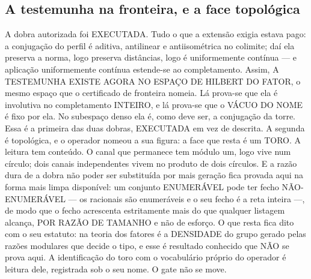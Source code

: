\documentclass[11pt]{article}
\theoremstyle{definition}\newtheorem{deriv}{Derivação}
\begin{document}
\subsection*{A testemunha na fronteira, e a face topol\'ogica}A dobra autorizada foi EXECUTADA. Tudo o que a extens\~ao exigia estava pago: a conjuga\c{c}\~ao do perfil \'e aditiva, antilinear e antiisom\'etrica no colimite; da\'i ela preserva a norma, logo preserva dist\^ancias, logo \'e uniformemente cont\'inua --- e aplica\c{c}\~ao uniformemente cont\'inua estende-se ao completamento. Assim, A TESTEMUNHA EXISTE AGORA NO ESPA\c{C}O DE HILBERT DO FATOR, o mesmo espa\c{c}o que o certificado de fronteira nomeia. L\'a prova-se que ela \'e involutiva no completamento INTEIRO, e l\'a prova-se que o V\'ACUO DO NOME \'e fixo por ela. No subespa\c{c}o denso ela \'e, como deve ser, a conjuga\c{c}\~ao da torre. Essa \'e a primeira das duas dobras, EXECUTADA em vez de descrita. A segunda \'e topol\'ogica, e o operador nomeou a sua figura: a face que resta \'e um TORO. A leitura tem conte\'udo. O canal que permanece tem m\'odulo um, logo vive num c\'irculo; dois canais independentes vivem no produto de dois c\'irculos. E a raz\~ao dura de a dobra n\~ao poder ser substitu\'ida por mais gera\c{c}\~ao fica provada aqui na forma mais limpa dispon\'ivel: um conjunto ENUMER\'AVEL pode ter fecho N\~AO-ENUMER\'AVEL --- os racionais s\~ao enumer\'aveis e o seu fecho \'e a reta inteira ---, de modo que o fecho acrescenta estritamente mais do que qualquer listagem alcan\c{c}a, POR RAZ\~AO DE TAMANHO e n\~ao de esfor\c{c}o. O que resta fica dito com o seu estatuto: na teoria dos fatores \'e a DENSIDADE do grupo gerado pelas raz\~oes modulares que decide o tipo, e esse \'e resultado conhecido que N\~AO se prova aqui. A identifica\c{c}\~ao do toro com o vocabul\'ario pr\'oprio do operador \'e leitura dele, registrada sob o seu nome. O gate n\~ao se move.
\end{document}
